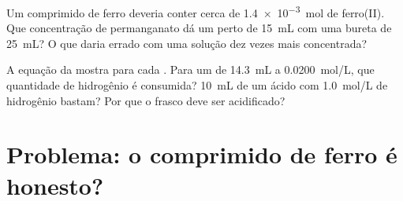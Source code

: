 \begin{exercise}[$\star\star\star$]\label{exo:g11:titration:14}
Um comprimido de ferro deveria conter cerca de \qty{1.4e-3}{mol} de
ferro(II). Que concentração de permanganato dá um 
perto de \qty{15}{mL} com uma bureta de \qty{25}{mL}? O que daria errado
com uma solução dez vezes mais concentrada?
\end{exercise}

\begin{exercise}[$\star\star\star$]\label{exo:g11:titration:15}
A equação da  mostra  para cada . Para um
 de \qty{14.3}{mL} a \qty{0.0200}{mol/L}, que
quantidade de  hidrogênio é consumida? \qty{10}{mL} de um ácido com
\qty{1.0}{mol/L} de  hidrogênio bastam? Por que o frasco deve ser
acidificado?
\end{exercise}

\section{Problema: o comprimido de ferro é honesto?}

